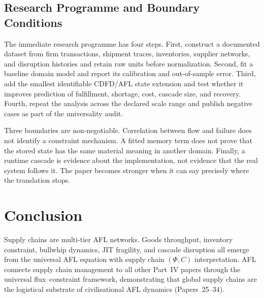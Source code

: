 \documentclass[11pt]{article}
\begin{document}
\subsection{Research Programme and Boundary Conditions}

The immediate research programme has four steps. First, construct a documented
dataset from firm transactions, shipment traces, inventories, supplier networks, and disruption histories and retain raw units before normalization.
Second, fit a baseline domain model and report its calibration and out-of-sample
error. Third, add the smallest identifiable CDFD/AFL state extension and test
whether it improves prediction of fulfillment, shortage, cost, cascade size, and recovery. Fourth, repeat the
analysis across the declared scale range and publish negative cases as part of
the universality audit.

Three boundaries are non-negotiable. Correlation between flow and failure does
not identify a constraint mechanism. A fitted memory term does not prove that
the stored state has the same material meaning in another domain. Finally, a
runtime cascade is evidence about the implementation, not evidence that the
real system follows it. The paper becomes stronger when it can say precisely
where the translation stops.



\section{Conclusion}

Supply chains are multi-tier AFL networks. Goods throughput, inventory constraint, bullwhip
dynamics, JIT fragility, and cascade disruption all emerge from the universal AFL equation with
supply chain $(\Phi, C)$ interpretation. AFL connects supply chain management to all other
Part~IV papers through the universal flux--constraint framework, demonstrating that global supply
chains are the logistical substrate of civilisational AFL dynamics (Papers~25--34).



\end{document}
